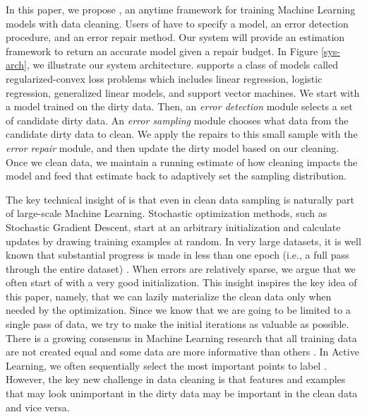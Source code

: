 In this paper, we propose \sys, an anytime framework for training Machine Learning models with data cleaning.
Users of \sys have to specify a model, an error detection procedure, and an error repair method.
Our system will provide an estimation framework to return an accurate model given a repair budget.
In Figure \ref{sys-arch}, we illustrate our system architecture.
\sys supports a class of models called regularized-convex loss problems which includes linear regression, logistic regression, generalized linear models, and support vector machines.
We start with a model trained on the dirty data.
Then, an \emph{error detection} module selects a set of candidate dirty data.
An \emph{error sampling} module chooses what data from the candidate dirty data to clean.
We apply the repairs to this small sample with the \emph{error repair} module, and then update the dirty model based on our cleaning.
Once we clean data, we maintain a running estimate of how cleaning impacts the model and feed that estimate back to adaptively set the sampling distribution.

The key technical insight of \sys is that even in clean data sampling is naturally part of large-scale Machine Learning.
Stochastic optimization methods, such as Stochastic Gradient Descent, start at an arbitrary initialization and calculate updates by drawing training examples at random. 
In very large datasets, it is well known that substantial progress is made in less than one epoch (i.e., a full pass through the entire dataset) \cite{bottou2012stochastic}.
When errors are relatively sparse, we argue that we often start of with a very good initialization.
This insight inspires the key idea of this paper, namely, that we can lazily materialize the clean data only when needed by the optimization.
Since we know that we are going to be limited to a single pass of data, we try to make the initial iterations as valuable as possible.
There is a growing consensus in Machine Learning research that all training data are not created equal and some data are more informative than others \cite{drineas2012fast, settles2010active}.
In Active Learning, we often sequentially select the most important points to label \cite{settles2010active}.
However, the key new challenge in data cleaning is that features and examples that may look unimportant in the dirty data may be important in the clean data and vice versa.

